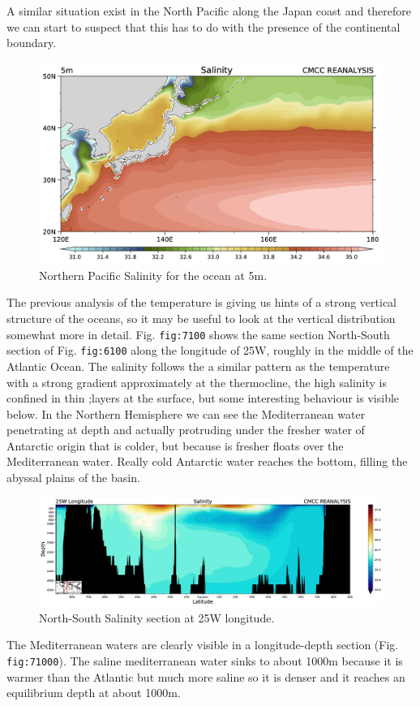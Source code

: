 A similar situation exist in the North Pacific along the Japan coast and
therefore we can start to suspect that this has to do with the presence
of the continental boundary.

\begin{figure}
\centering
\includegraphics[width = .7 \textwidth]{figs/GD/SKur5.png}
\caption{Northern Pacific Salinity for the ocean at 5m.}
\end{figure}

The previous analysis of the temperature is giving us hints of a strong
vertical structure of the oceans, so it may be useful to look at the
vertical distribution somewhat more in detail. Fig. \texttt{fig:7100}
shows the same section North-South section of Fig. \texttt{fig:6100}
along the longitude of 25W, roughly in the middle of the Atlantic Ocean.
The salinity follows the a similar pattern as the temperature with a
strong gradient approximately at the thermocline, the high salinity is
confined in thin ;layers at the surface, but some interesting behaviour
is visible below. In the Northern Hemisphere we can see the
Mediterranean water penetrating at depth and actually protruding under
the fresher water of Antarctic origin that is colder, but because is
fresher floats over the Mediterranean water. Really cold Antarctic water
reaches the bottom, filling the abyssal plains of the basin.

\begin{figure}
\centering
\includegraphics[width = .7 \textwidth]{figs/GD/SectSal25W5000.png}
\caption{North-South Salinity section at 25W longitude.}
\end{figure}

The Mediterranean waters are clearly visible in a longitude-depth
section (Fig. \texttt{fig:71000}). The saline mediterranean water sinks
to about 1000m because it is warmer than the Atlantic but much more
saline so it is denser and it reaches an equilibrium depth at about
1000m.

